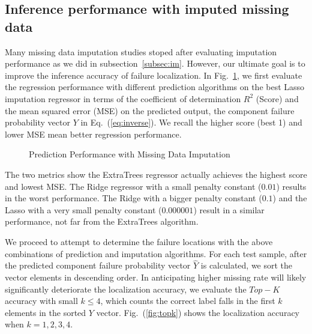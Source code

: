 \subsection{Inference performance with imputed missing data}
Many missing data imputation studies stoped after evaluating imputation performance as we did in subsection~\ref{subsec:im}. 
However, our ultimate goal is to improve the inference accuracy of failure localization. In Fig.~\ref{fig:score}, we first evaluate the 
regression performance with different prediction algorithms on the best Lasso imputation regressor in terms of the 
coefficient of determination $R^2$ (Score) and the mean squared error (MSE) on the predicted output, the component 
failure probability vector $Y$ in Eq.~(\ref{eq:inverse}). We recall the higher score (best 1) and lower MSE mean better regression performance. 

  \begin{figure}[!ht]
    \hfill
    \caption{Prediction Performance with Missing Data Imputation}
    \label{fig:score}
  \end{figure}
  
  The two metrics show the ExtraTrees regressor actually achieves the highest score and lowest MSE. The Ridge regressor with 
  a small penalty constant ($0.01$) results in the worst performance. The Ridge with
  a bigger penalty constant ($0.1$) and the Lasso with a very small penalty constant ($0.000001$) result in a similar performance, 
  not far from the ExtraTrees algorithm. 
  
  We proceed to attempt to determine the failure locations with the above combinations of prediction and imputation algorithms.
  For each test sample, after the predicted component failure probability vector $\hat{Y}$ is calculated, we sort the vector 
  elements in descending order. In anticipating higher missing rate will likely significantly deteriorate the localization accuracy, 
  we evaluate the $Top-K$ accuracy with small $k\le4$, which counts the correct label falls in the first $k$ elements in the 
  sorted $Y$ vector. Fig.~(\ref{fig:topk}) shows the localization accuracy when $k=1,2,3,4$. 
  
